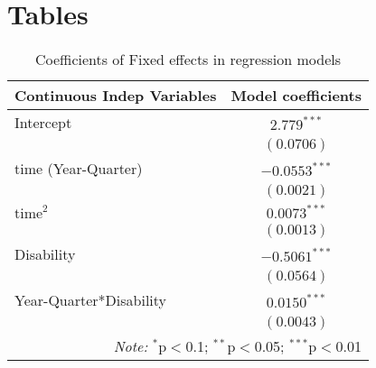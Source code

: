 
\section{Tables}

\noindent
\begin{table}[H] 
\centering 
\footnotesize
\begin{tabular}{l|c}
\hline 
\hline 
%
Continuous Indep Variables & Model coefficients \\
\hline 
Intercept		&	$2.779^{***}$		\\
			&	$(0.0706)$		\\
time (Year-Quarter)	&	$-0.0553^{***}$		\\
			&	$(0.0021)$		\\
$\text{time}^2$		&	$0.0073^{***}$		\\
			&	$(0.0013)$		\\
Disability		&	$-0.5061^{***}$		\\    
			&	$(0.0564)$		\\
Year-Quarter*Disability	&	$0.0150^{***}$		\\
			&	$(0.0043)$		\\
\hline 
\hline 
\multicolumn{2}{r}{\textit{Note:}  $^{*}$p$<$0.1; $^{**}$p$<$0.05; $^{***}$p$<$0.01} \\ 

\end{tabular}
\caption{Coefficients of Fixed effects in regression models} 
\label{tab:FixedEffectsBetas} 
\end{table}


